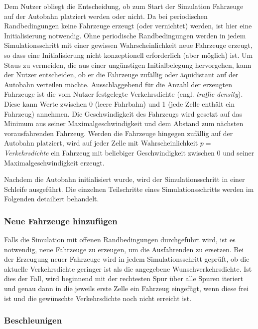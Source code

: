 \documentclass[10pt, a4paper]{article}
\begin{document}
Dem Nutzer obliegt die Entscheidung, ob zum Start der Simulation Fahrzeuge auf der Autobahn platziert werden oder nicht. Da bei periodischen Randbedingungen keine Fahrzeuge erzeugt (oder vernichtet) werden, ist hier eine Initialisierung notwendig. Ohne periodische Randbedingungen werden in jedem Simulationsschritt mit einer gewissen Wahrscheinlichkeit neue Fahrzeuge erzeugt, so dass eine Initialisierung nicht konzeptionell erforderlich (aber möglich) ist. Um Staus zu vermeiden, die aus einer ungünstigen Initialbelegung hervorgehen, kann der Nutzer entscheiden, ob er die Fahrzeuge zufällig oder äquidistant auf der Autobahn verteilen möchte.
Ausschlaggebend für die Anzahl der erzeugten Fahrzeuge ist die vom Nutzer festgelegte Verkehrsdichte (engl. \emph{traffic density}). Diese kann Werte zwischen 0 (leere Fahrbahn) und 1 (jede Zelle enthält ein Fahrzeug) annehmen. Die Geschwindigkeit des Fahrzeugs wird gesetzt auf das Minimum aus seiner Maximalgeschwindigkeit und dem Abstand zum nächsten vorausfahrenden Fahrzeug. Werden die Fahrzeuge hingegen zufällig auf der Autobahn platziert, wird auf jeder Zelle mit Wahrscheinlichkeit $p =$ \emph{Verkehrsdichte} ein Fahrzeug mit beliebiger Geschwindigkeit zwischen 0 und seiner Maximalgeschwindigkeit erzeugt.

Nachdem die Autobahn initialisiert wurde, wird der Simulationsschritt in einer Schleife ausgeführt. Die einzelnen Teilschritte eines Simulationsschritts werden im Folgenden detailiert behandelt.


\subsubsection{Neue Fahrzeuge hinzufügen}
\label{subsubsec:neueFahrzeuge}

Falls die Simulation mit offenen Randbedingungen durchgeführt wird, ist es notwendig, neue Fahrzeuge zu erzeugen, um die Ausfahrenden zu ersetzen. Bei der Erzeugung neuer Fahrzeuge wird in jedem Simulationsschritt geprüft, ob die aktuelle Verkehrsdichte geringer ist als die angegebene Wunschverkehrsdichte. Ist dies der Fall, wird beginnend mit der rechtesten Spur über alle Spuren iteriert und genau dann in die jeweils erste Zelle ein Fahrzeug eingefügt, wenn diese frei ist und die gewünschte Verkehrsdichte noch nicht erreicht ist.

\subsubsection{Beschleunigen}
\label{subsubsec:beschleunigen}
\end{document}
